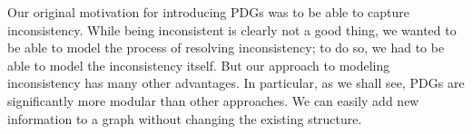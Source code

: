 \documentclass{article}
\newcommand{\MN}{PDG}
\numberwithin{equation}{section}
\begin{document}
Our original motivation for introducing PDGs was to be able to capture
inconsistency.  
While being inconsistent is clearly not a good thing,
we wanted to be able to model the process of resolving inconsistency;
to do so, we had to be able to model the inconsistency itself.  
But our approach to modeling inconsistency has many other advantages.
In particular, as we shall see, \MN s are significantly more modular
than other approaches.
We can easily add new information to a graph
without changing the existing structure. 
\end{document}
